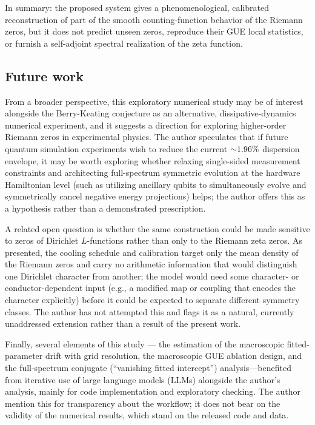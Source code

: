 \documentclass[mca,article,submit,oneauthor,pdftex]{Definitions/mdpi}
\begin{document}
In summary: the proposed system gives a phenomenological, calibrated
reconstruction of part of the smooth counting-function behavior of the
Riemann zeros, but it does not predict unseen zeros, reproduce their GUE
local statistics, or furnish a self-adjoint spectral realization of the zeta
function.

\subsection{Future work}

From a broader perspective, this exploratory numerical study may be of
interest alongside the Berry-Keating conjecture as an alternative,
dissipative-dynamics numerical experiment, and it suggests a direction for
exploring higher-order Riemann zeros in experimental physics. The author speculates
that if future quantum simulation experiments wish to reduce the
current \(\text{\ensuremath{\sim}1.96\%}\) dispersion envelope, it may be worth
exploring whether relaxing single-sided measurement constraints and
architecting full-spectrum symmetric evolution at the hardware Hamiltonian
level (such as utilizing ancillary qubits to simultaneously evolve and
symmetrically cancel negative energy projections) helps; the author offers this as
a hypothesis rather than a demonstrated prescription.

A related open question is whether the same construction could be made
sensitive to zeros of Dirichlet $L$-functions rather than only to the
Riemann zeta zeros. As presented, the cooling schedule and calibration
target only the mean density of the Riemann zeros and carry no
arithmetic information that would distinguish one Dirichlet character
from another; the model would need some character- or
conductor-dependent input (e.g., a modified map or coupling that encodes
the character explicitly) before it could be expected to separate
different symmetry classes. The author has not attempted this and flags it
as a natural, currently unaddressed extension rather than a result of
the present work.

Finally, several elements of this study --- the estimation of the
macroscopic fitted-parameter drift with grid resolution, the macroscopic GUE ablation
design, and the full-spectrum conjugate (``vanishing fitted intercept'')
analysis---benefited from iterative use of large language models
(LLMs) alongside the author's analysis, mainly for code implementation
and exploratory checking. The author mention this for transparency about the
workflow; it does not bear on the validity of the numerical results,
which stand on the released code and data.
\end{document}
